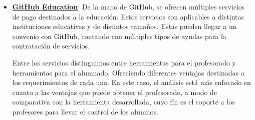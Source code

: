 \begin{itemize}
	\item \textbf{\href{https://education.github.com}{GitHub Education}}: De la mano de GitHub, se ofrecen múltiples servicios de pago destinados a la educación. Estos servicios son aplicables a distintas instituciones educativas y de distintos tamaños. Estas pueden llegar a un convenio con GitHub, contando con múltiples tipos de ayudas para la contratación de servicios.

		Entre los servicios distinguimos entre herramientas para el profesorado y herramientas para el alumnado. Ofreciendo diferentes ventajas destinadas a los requerimientos de cada uno.
		En este caso, el análisis está más enfocado en cuanto a las ventajas que puede obtener el profesorado, a modo de comparativa con la herramienta desarrollada, cuyo fín es el soporte a los profesores para llevar el control de los alumnos.
		

\end{itemize}
